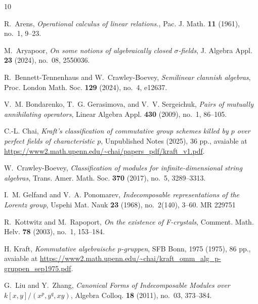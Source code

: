 \documentclass[12pt]{amsart}
\theoremstyle{definition}
\newcommand{\<}{\langle}   %
\renewcommand{\>}{\rangle} %
\begin{document}
%
%
\providecommand{\bysame}{\leavevmode\hbox to3em{\hrulefill}\thinspace}
\providecommand{\MR}{\relax\ifhmode\unskip\space\fi MR }
\providecommand{\MRhref}[2]{%
  \href{http://www.ams.org/mathscinet-getitem?mr=#1}{#2}
}
\providecommand{\href}[2]{#2}
\begin{thebibliography}{10}

R.~Arens, \emph{Operational calculus of linear relations.}, Pac. J. Math. \textbf{11} (1961), no.~1, 9--23.

M.~Aryapoor, \emph{On some notions of algebraically closed {$\sigma$}-fields}, J. Algebra Appl. \textbf{23} (2024), no.~08, 2550036.

R.~{Bennett-Tennenhaus} and W.~{Crawley-Boevey}, \emph{Semilinear clannish algebras}, Proc. London Math. Soc. \textbf{129} (2024), no.~4, e12637.

V.~M. Bondarenko, T.~G. Gerasimova, and V.~V. Sergeichuk, \emph{Pairs of mutually annihilating operators}, Linear Algebra Appl. \textbf{430} (2009), no.~1, 86--105.

{C}.-{L}. {C}hai, \emph{{Kraft's classification of commutative group schemes killed by $p$ over perfect fields of characteristic $p$}}, Unpublished Notes (2025), 36 pp., avaiable at \url{https://www2.math.upenn.edu/~chai/papers_pdf/kraft_v1.pdf}.

W.~{Crawley-Boevey}, \emph{Classification of modules for infinite-dimensional string algebras}, Trans. Amer. Math. Soc. \textbf{370} (2017), no.~5, 3289--3313.

I.~M. Gelfand and V.~A. Ponomarev, \emph{Indecomposable representations of the {L}orentz group}, Uspehi Mat. Nauk \textbf{23} (1968), no.~2(140), 3--60. \MR{229751}

R.~Kottwitz and M.~Rapoport, \emph{On the existence of {{F-crystals}}}, Comment. Math. Helv. \textbf{78} (2003), no.~1, 153--184.

{H}. Kraft, \emph{{Kommutative algebraische $p$-gruppen}}, SFB Bonn, 1975 (1975), 86 pp., avaiable at \url{https://www2.math.upenn.edu/~chai/kraft_omm_alg_p-gruppen_sep1975.pdf}.

G.~Liu and Y.~Zhang, \emph{Canonical {{Forms}} of {{Indecomposable Modules}} over $k[x,y]/(x^p,y^q,xy)$}, Algebra Colloq. \textbf{18} (2011), no.~03, 373--384.


\end{thebibliography}
\end{document}
